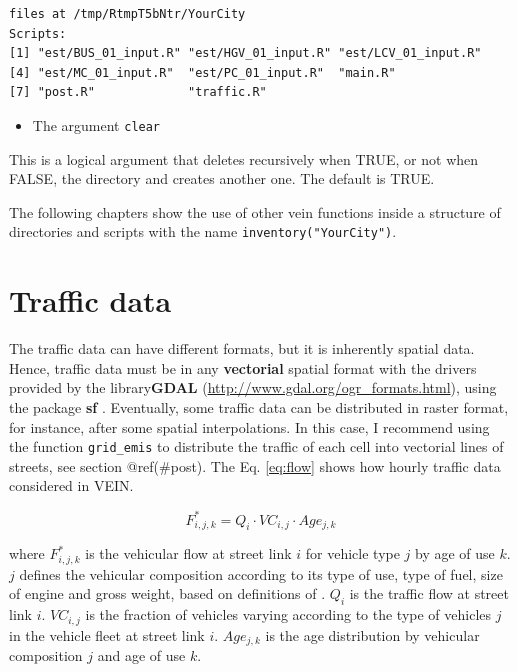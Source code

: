 \documentclass[12pt,graybox,envcountchap,sectrefs]{krantz}
\providecommand{\tightlist}{%
  \setlength{\itemsep}{0pt}\setlength{\parskip}{0pt}}
\theoremstyle{definition}
\theoremstyle{definition}
\theoremstyle{definition}
\theoremstyle{remark}
\begin{document}
\begin{verbatim}
files at /tmp/RtmpT5bNtr/YourCity
Scripts:
[1] "est/BUS_01_input.R" "est/HGV_01_input.R" "est/LCV_01_input.R"
[4] "est/MC_01_input.R"  "est/PC_01_input.R"  "main.R"            
[7] "post.R"             "traffic.R"   
\end{verbatim}

\begin{itemize}
\tightlist
\item
  The argument \texttt{clear}
\end{itemize}

This is a logical argument that deletes recursively when TRUE, or not
when FALSE, the directory and creates another one. The default is TRUE.

The following chapters show the use of other vein functions inside a
structure of directories and scripts with the name
\texttt{inventory("YourCity")}.

\chapter{Traffic data}\label{traffic}

The traffic data can have different formats, but it is inherently
spatial data. Hence, traffic data must be in any \textbf{vectorial}
spatial format with the drivers provided by the library\textbf{GDAL}
(\url{http://www.gdal.org/ogr_formats.html}), using the package
\textbf{sf} \citep{sf}. Eventually, some traffic data can be distributed
in raster format, for instance, after some spatial interpolations. In
this case, I recommend using the function \texttt{grid\_emis} to
distribute the traffic of each cell into vectorial lines of streets, see
section @ref(\#post). The Eq. \eqref{eq:flow} shows how hourly traffic
data considered in VEIN.

\begin{equation}
F^*_{i,j,k} = Q_{i} \cdot VC_{i,j} \cdot Age_{j,k}
\label{eq:flow}
\end{equation}

where \(F^*_{i,j,k}\) is the vehicular flow at street link \(i\) for
vehicle type \(j\) by age of use \(k\). \(j\) defines the vehicular
composition according to its type of use, type of fuel, size of engine
and gross weight, based on definitions of \citep{Corvalanetal2002}.
\(Q_i\) is the traffic flow at street link \(i\). \(VC_{i,j}\) is the
fraction of vehicles varying according to the type of vehicles \(j\) in
the vehicle fleet at street link \(i\). \(Age_{j,k}\) is the age
distribution by vehicular composition \(j\) and age of use \(k\).
\end{document}
